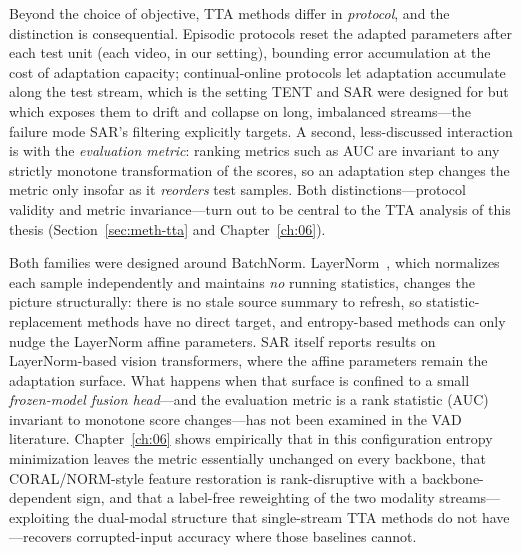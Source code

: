 Beyond the choice of objective, TTA methods differ in \emph{protocol}, and the distinction is
consequential. Episodic protocols reset the adapted parameters after each test unit (each video,
in our setting), bounding error accumulation at the cost of adaptation capacity; continual-online
protocols let adaptation accumulate along the test stream, which is the setting TENT and SAR were
designed for but which exposes them to drift and collapse on long, imbalanced streams---the
failure mode SAR's filtering explicitly targets. A second, less-discussed interaction is with the
\emph{evaluation metric}: ranking metrics such as AUC are invariant to any strictly monotone
transformation of the scores, so an adaptation step changes the metric only insofar as it
\emph{reorders} test samples. Both distinctions---protocol validity and metric invariance---turn
out to be central to the TTA analysis of this thesis (Section~\ref{sec:meth-tta} and
Chapter~\ref{ch:06}).

Both families were designed around BatchNorm. LayerNorm~\cite{ba2016layernorm}, which normalizes
each sample independently and maintains \emph{no} running statistics, changes the picture
structurally: there is no stale source summary to refresh, so statistic-replacement methods have
no direct target, and entropy-based methods can only nudge the LayerNorm affine parameters. SAR
itself reports results on LayerNorm-based vision transformers, where the affine parameters remain
the adaptation surface. What happens when that surface is confined to a small \emph{frozen-model
fusion head}---and the evaluation metric is a rank statistic (AUC) invariant to monotone score
changes---has not been examined in the VAD literature. Chapter~\ref{ch:06} shows empirically that
in this configuration entropy minimization leaves the metric essentially unchanged on every
backbone, that CORAL/NORM-style feature restoration is rank-disruptive with a backbone-dependent
sign, and that a label-free reweighting of the two modality streams---exploiting the dual-modal
structure that single-stream TTA methods do not have---recovers corrupted-input accuracy where
those baselines cannot.
